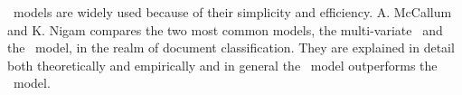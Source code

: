 	\nb\ models are widely used because of their simplicity and efficiency. A. McCallum and K. Nigam compares the two most common models, the multi-variate \bn\ and the \mn\ model, in the realm of document classification. They are explained in detail both theoretically and empirically and in general the \mn\ model outperforms the \bn\ model. \cite{McCallum98acomparison}
